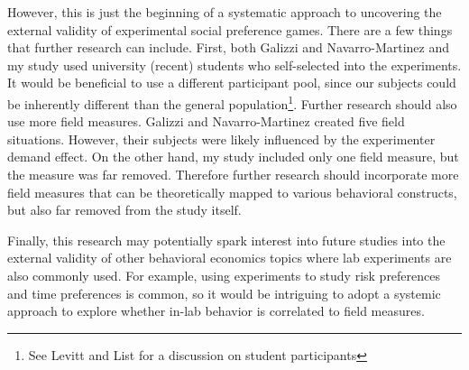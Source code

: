 \documentclass[12pt]{article}
\begin{document}
However, this is just the beginning of a systematic approach to uncovering the external validity of experimental social preference games. There are a few things that further research can include. First, both Galizzi and Navarro-Martinez and my study used university (recent) students who self-selected into the experiments. It would be beneficial to use a different participant pool, since our subjects could be inherently different than the general population\footnote{See Levitt and List for a discussion on student participants}. Further research should also use more field measures. Galizzi and Navarro-Martinez created five field situations. However, their subjects were likely influenced by the experimenter demand effect. On the other hand, my study included only one field measure, but the measure was far removed. Therefore further research should incorporate more field measures that can be theoretically mapped to various behavioral constructs, but also far removed from the study itself.

Finally, this research may potentially spark interest into future studies into the external validity of other behavioral economics topics where lab experiments are also commonly used. For example, using experiments to study risk preferences and time preferences is common, so it would be intriguing to adopt a systemic approach to explore whether in-lab behavior is correlated to field measures.

\newpage

%
\end{document}
